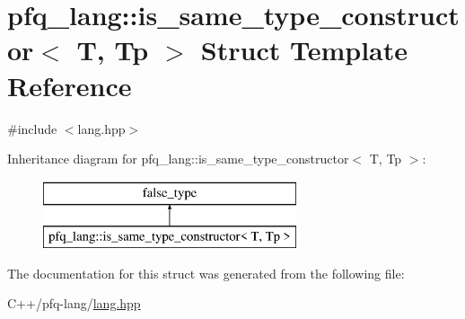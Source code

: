 \hypertarget{structpfq__lang_1_1is__same__type__constructor}{\section{pfq\+\_\+lang\+:\+:is\+\_\+same\+\_\+type\+\_\+constructor$<$ T, Tp $>$ Struct Template Reference}
\label{structpfq__lang_1_1is__same__type__constructor}
}


{\ttfamily \#include $<$lang.\+hpp$>$}

Inheritance diagram for pfq\+\_\+lang\+:\+:is\+\_\+same\+\_\+type\+\_\+constructor$<$ T, Tp $>$\+:\begin{figure}[H]
\begin{center}
\leavevmode
\includegraphics[height=2.000000cm]{structpfq__lang_1_1is__same__type__constructor}
\end{center}
\end{figure}


The documentation for this struct was generated from the following file\+:\begin{DoxyCompactItemize}
\item 
C++/pfq-\/lang/\hyperlink{lang_8hpp}{lang.\+hpp}\end{DoxyCompactItemize}

